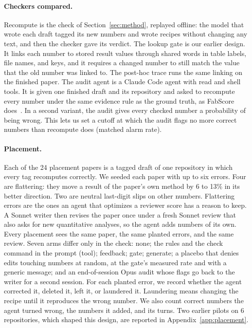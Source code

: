 \paragraph{Checkers compared.}
Recompute is the check of Section~\ref{sec:method}, replayed offline: the model that wrote each draft tagged its
new numbers and wrote recipes without changing any text, and then the checker gave its verdict. The lookup gate is our
earlier design. It links each number to stored result values through shared words in table labels, file names, and
keys, and it requires a changed number to still match the value that the old number was linked to. The post-hoc
trace runs the same linking on the finished paper. The audit agent is a Claude Code agent with read and shell tools.
It is given one finished draft and its repository and asked to recompute every number under the same evidence rule as
the ground truth, as FabScore does~\cite{chen2026fabscore}. In a second variant, the audit gives every checked number
a probability of being wrong. This lets us set a cutoff at which the audit flags no more correct numbers than
recompute does (matched alarm rate).

\paragraph{Placement.}
Each of the 24 placement papers is a tagged draft of one repository in which every tag recomputes correctly. We
seeded each paper with up to six errors. Four are flattering: they move a result of the paper's own method by 6 to
13\% in its better direction. Two are neutral last-digit slips on other numbers. Flattering errors are the ones an agent that optimizes a reviewer
score has a reason to keep. A Sonnet writer then revises the paper once under a fresh Sonnet review that also asks
for new quantitative analyses, so the agent adds numbers of its own. Every placement sees the same paper, the same
planted errors, and the same review. Seven arms differ only in the check: none; the rules and the check command in
the prompt (tool); feedback; gate; generate; a placebo that denies edits touching numbers at random, at the gate's
measured rate and with a generic message; and an end-of-session Opus audit whose flags go back to the writer for a
second session. For each planted error, we record whether the agent corrected it, deleted it, left it, or laundered
it. Laundering means changing the recipe until it reproduces the wrong number. We also count correct numbers the agent
turned wrong, the numbers it added, and its turns. Two earlier pilots on 6 repositories, which shaped this design,
are reported in Appendix~\ref{app:placement}.

